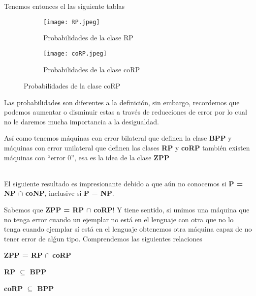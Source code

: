 \documentclass[12pt,letterpaper]{article}
\begin{document}
Tenemos entonces el las siguiente tablas

\begin{figure}[htb]
    \begin{subfigure}
        \centering
        \texttt{[image: RP.jpeg]}       
        \caption*{Probabilidades de la clase RP}
        \label{fig:primer}
    \end{subfigure}
    \begin{subfigure}
        \centering
        \texttt{[image: coRP.jpeg]}       
        \caption*{Probabilidades de la clase coRP}
        \label{fig:primer}
    \end{subfigure}
\end{figure}    

Las probabilidades son diferentes a la definición, sin embargo, recordemos que podemos aumentar o disminuir estas a través de reducciones de error por lo cual no le daremos mucha importancia a la desigualdad.

Así como tenemos máquinas con error bilateral que definen la clase \textbf{BPP} y máquinas con error unilateral que definen las clases \textbf{RP} y \textbf{coRP} también existen máquinas con ``error 0'', esa es la idea de la clase \textbf{ZPP}

\\

El siguiente resultado es impresionante debido a que aún no conocemos si \textbf{P = NP $\cap$ coNP}, inclusive si \textbf{P = NP}.

Sabemos que \textbf{ZPP = RP $\cap$ coRP}! Y tiene sentido, si unimos una máquina que no tenga error cuando un ejemplar no está en el lenguaje con otra que no lo tenga cuando ejemplar sí está en el lenguaje obtenemos otra máquina capaz de no tener error de alǵun tipo. Comprendemos las siguientes relaciones

\begin{center}
    \textbf{ZPP = RP $\cap$ coRP}
    
    \textbf{RP $\subseteq$ BPP}

    \textbf{coRP $\subseteq$ BPP}
    
\end{center}
\end{document}
